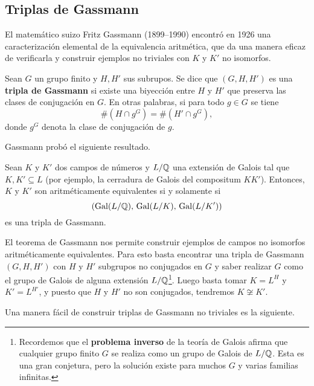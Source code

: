 \subsection{Triplas de Gassmann}

El matemático suizo Fritz Gassmann (1899--1990) encontró en 1926 una
caracterización elemental de la equivalencia aritmética, que da una manera
eficaz de verificarla y construir ejemplos no triviales con $K$ y $K'$ no
isomorfos.

\begin{definicion}
  Sean $G$ un grupo finito y $H, H'$ sus subrupos. Se dice que $(G,H,H')$ es una
  \textbf{tripla de Gassmann} si existe una biyección entre $H$ y $H'$ que
  preserva las clases de conjugación en $G$. En otras palabras, si para todo
  $g \in G$ se tiene
  $$\# (H\cap g^G) = \# (H'\cap g^G),$$
  donde $g^G$ denota la clase de conjugación de $g$.
\end{definicion}

Gassmann probó el siguiente resultado.

\begin{teorema}
  \label{thm:Gassmann}
  Sean $K$ y $K'$ dos campos de números y $L/\mathbb{Q}$ una extensión de Galois tal
  que $K, K' \subseteq L$ (por ejemplo, la cerradura de Galois del compositum
  $K K'$). Entonces, $K$ y $K'$ son aritméticamente equivalentes si y solamente
  si
  $$(\operatorname{Gal} (L/\mathbb{Q}), \, \operatorname{Gal} (L/K), \, \operatorname{Gal} (L/K'))$$
  es una tripla de Gassmann.
\end{teorema}

El teorema de Gassmann nos permite construir ejemplos de campos no isomorfos
aritméticamente equivalentes. Para esto basta encontrar una tripla de Gassmann
$(G, H, H')$ con $H$ y $H'$ subgrupos no conjugados en $G$ y saber realizar $G$
como el grupo de Galois de alguna extensión $L/\mathbb{Q}$\footnote{Recordemos que el
  \textbf{problema inverso} de la teoría de Galois afirma que cualquier grupo
  finito $G$ se realiza como un grupo de Galois de $L/\mathbb{Q}$. Esta es una gran
  conjetura, pero la solución existe para muchos $G$ y varias familias
  infinitas.}. Luego basta tomar $K = L^H$ y $K' = L^{H'}$, y puesto que $H$ y
$H'$ no son conjugados, tendremos $K \not\cong K'$.

Una manera fácil de construir triplas de Gassmann no triviales es la siguiente.

